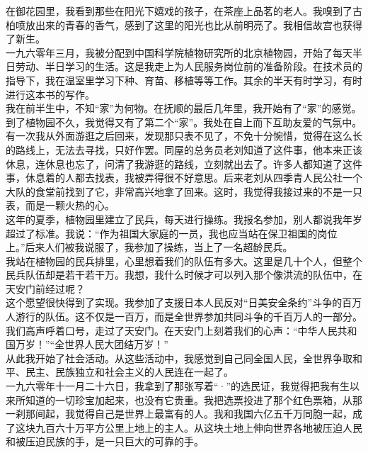 在御花园里，我看到那些在阳光下嬉戏的孩子，在茶座上品茗的老人。我嗅到了古柏喷放出来的青春的香气，感到了这里的阳光也比从前明亮了。我相信故宫也获得了新生。\\

一九六零年三月，我被分配到中国科学院植物研究所的北京植物园，开始了每天半日劳动、半日学习的生活。这是我走上为人民服务岗位前的准备阶段。在技术员的指导下，我在温室里学习下种、育苗、移植等等工作。其余的半天有时学习，有时进行这本书的写作。\\

我在前半生中，不知“家”为何物。在抚顺的最后几年里，我开始有了“家”的感觉。到了植物园不久，我觉得又有了第二个“家”。我处在自上而下互助友爱的气氛中。有一次我从外面游逛之后回来，发现那只表不见了，不免十分惋惜，觉得在这么长的路线上，无法去寻找，只好作罢。同屋的总务员老刘知道了这件事，他本来正该休息，连休息也忘了，问清了我游逛的路线，立刻就出去了。许多人都知道了这件事，休息着的人都去找表，我被弄得很不好意思。后来老刘从四季青人民公社一个大队的食堂前找到了它，非常高兴地拿了回来。这时，我觉得我接过来的不是一只表，而是一颗火热的心。\\

这年的夏季，植物园里建立了民兵，每天进行操练。我报名参加，别人都说我年岁超过了标准。我说：“作为祖国大家庭的一员，我也应当站在保卫祖国的岗位上。”后来人们被我说服了，我参加了操练，当上了一名超龄民兵。\\

我站在植物园的民兵排里，心里想着我们的队伍有多大。这里是几十个人，但整个民兵队伍却是若干若干万。我想，我什么时候才可以列入那个像洪流的队伍中，在天安门前经过呢？\\

这个愿望很快得到了实现。我参加了支援日本人民反对“日美安全条约”斗争的百万人游行的队伍。这不仅是一百万，而是全世界参加共同斗争的千百万人的一部分。我们高声呼着口号，走过了天安门。在天安门上刻着我们的心声：“中华人民共和国万岁！”“全世界人民大团结万岁！”\\

从此我开始了社会活动。从这些活动中，我感觉到自己同全国人民，全世界争取和平、民主、民族独立和社会主义的人民连在一起了。\\

一九六零年十一月二十六日，我拿到了那张写着“·”的选民证，我觉得把我有生以来所知道的一切珍宝加起来，也没有它贵重。我把选票投进了那个红色票箱，从那一刹那间起，我觉得自己是世界上最富有的人。我和我国六亿五千万同胞一起，成了这块九百六十万平方公里上地上的主人。从这块土地上伸向世界各地被压迫人民和被压迫民族的手，是一只巨大的可靠的手。\\

